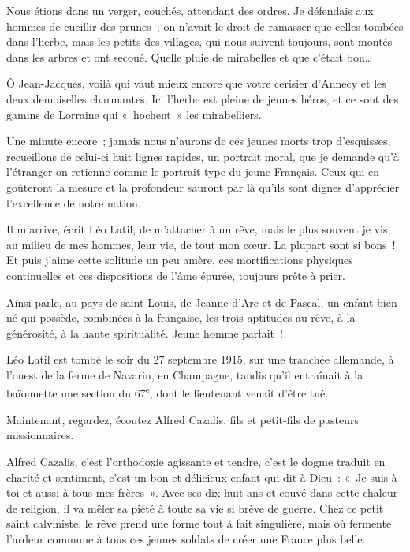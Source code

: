 \documentclass[french,twoside]{book} %
\newenvironment{quoteblock}%
  {\begin{quoting}}
  {\end{quoting}}
\newenvironment{quotebar}{%
    \def\FrameCommand{{\color{rubric!10!}\vrule width 0.5em} \hspace{0.9em}}%
    \def\OuterFrameSep{\itemsep} %
    \MakeFramed {\advance\hsize-\width \FrameRestore}
  }%
  {%
    \endMakeFramed
  }
\renewenvironment{quoteblock}%
  {%
    \savenotes
    \setstretch{0.9}
    \normalfont
    \begin{quotebar}
  }
  {%
    \end{quotebar}
    \spewnotes
  }
\begin{document}
\begin{quoteblock}
 \noindent Nous étions dans un verger, couchés, attendant des ordres. Je défendais aux hommes de cueillir des prunes ; on n’avait le droit de ramasser que celles tombées dans l’herbe, mais les petits des villages, qui nous suivent toujours, sont montés dans les arbres et ont secoué. Quelle pluie de mirabelles et que c’était bon…‌
 \end{quoteblock}

\noindent Ô Jean-Jacques, voilà qui vaut mieux encore que votre cerisier d’Annecy et les deux demoiselles charmantes. Ici l’herbe est pleine de jeunes héros, et ce sont des gamins de Lorraine qui « hochent » les mirabelliers.‌\par
Une minute encore ; jamais nous n’aurons de ces jeunes morts trop d’esquisses, recueillons de celui-ci huit lignes rapides, un portrait moral, que je demande qu’à l’étranger on retienne comme le portrait type du jeune Français. Ceux qui en goûteront la mesure et la profondeur sauront par là qu’ils sont dignes d’apprécier l’excellence de notre nation.‌\par

\begin{quoteblock}
 \noindent Il m’arrive, écrit Léo Latil, de m’attacher à un rêve, mais le plus souvent je vis, au milieu de mes hommes, leur vie, de tout mon cœur. La plupart sont si bons ! Et puis j’aime cette solitude un peu amère, ces mortifications physiques continuelles et ces dispositions de l’âme épurée, toujours prête à prier.‌
 \end{quoteblock}

\noindent Ainsi parle, au pays de saint Louis, de Jeanne d’Arc et de Pascal, un enfant bien né qui possède, combinées à la française, les trois aptitudes au rêve, à la générosité, à la haute spiritualité. Jeune homme parfait !‌\par
Léo Latil est tombé le soir du 27 septembre 1915, sur une tranchée allemande, à l’ouest de la ferme de Navarin, en Champagne, tandis qu’il entraînait à la baïonnette une section du 67\textsuperscript{e}, dont le lieutenant venait d’être tué.‌\par
Maintenant, regardez, écoutez Alfred Cazalis, fils et petit-fils de pasteurs missionnaires.‌\par
Alfred Cazalis, c’est l’orthodoxie agissante et tendre, c’est le dogme traduit en charité et sentiment, c’est un bon et délicieux enfant qui dit à Dieu : « Je suis à toi et aussi à tous mes frères ». Avec ses dix-huit ans et couvé dans cette chaleur de religion, il va mêler sa piété à toute sa vie si brève de guerre. Chez ce petit saint calviniste, le rêve prend une forme tout à fait singulière, mais où fermente l’ardeur commune à tous ces jeunes soldats de créer une France plus belle.‌\par
\end{document}
